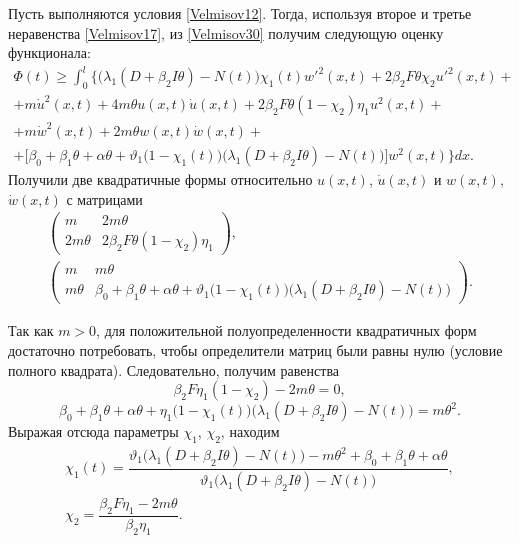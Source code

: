 Пусть выполняются условия \eqref{Velmisov12}.  Тогда, используя второе и третье неравенства \eqref{Velmisov17}, из  \eqref{Velmisov30} получим следующую оценку функционала:
\begin{multline}
\label{Velmisov31} 
\Phi(t)\ge \int_{0}^{l}
\bigl\{
\bigl(\lambda_1(D+\beta _{2}I \theta) -N(t)\bigr)\chi_1(t)w'^{2} (x,t)+
2\beta _{2}F \theta\chi_2 u'^{2} (x,t)+
\\
+m\dot{u}^{2} (x,t)+4m\theta u(x,t)\dot{u}(x,t)+2\beta _{2}F \theta (1-\chi_2)\eta _{1} u^{2} (x,t)+
\\ 
+m\dot{w}^{2} (x,t)+2m\theta w(x,t)\dot{w}(x,t)+
\\
+
\bigl[\beta _{0} +\beta _{1} \theta +\alpha \theta +\vartheta _{1} \bigl(1-\chi_1(t)\bigr) 
\bigl(\lambda _{1} (D+\beta _{2} I\theta )-N(t)\bigr)\bigr]w^{2} (x,t)\bigr\}dx.
\end{multline}
Получили две квадратичные формы относительно $u(x,t)$, $\dot{u}(x,t)$ и $w(x,t),$ $\dot{w}(x,t)$ с матрицами
\begin{gather*}
\left(\begin{array}{cc} {m} & {2m\theta}
 \\ {2m\theta} & {2\beta _{2}F \theta (1-\chi_2) \eta _{1} } \end{array}\right),
\\ 
\left(\begin{array}{cc} {m} & {m\theta}
 \\ {m\theta} & \beta _{0} +\beta _{1} \theta +\alpha \theta +\vartheta _{1} 
 \bigl(1-\chi_1(t)\bigr) \bigl(\lambda _{1} (D+\beta _{2} I\theta )-N(t)\bigr)  
\end{array}
\right).
\end{gather*}
 
Так как $m>0$, для положительной полуопределенности квадратичных форм достаточно потребовать, чтобы определители матриц были равны нулю (условие полного квадрата). 
Следовательно, получим равенства
\[ 
\beta _{2}F \eta _{1}(1-\chi_2) -2m\theta = 0, 
\]
\[
\beta _{0} +\beta _{1} \theta +\alpha \theta +
\eta _{1} \bigl(1-\chi_1(t)\bigr) \bigl( \lambda _{1} (D+\beta _{2}I \theta )-N(t)\bigr)=m\theta ^{2}. 
\]
Выражая отсюда параметры $\chi_1$, $\chi_2$, находим
\begin{equation} \label{Velmisov32} 
\begin{array}{l}
\chi_1(t)=\dfrac{\vartheta _{1} \bigl(\lambda _{1} (D+\beta _{2}I \theta )- N(t)\bigr) - 
m\theta ^{2} + \beta _{0}  + \beta _{1} \theta  + \alpha \theta}{\vartheta _{1} \bigl(\lambda _{1} (D+\beta _{2}I \theta )-N(t)\bigr)},\\[3mm]
\chi_2=\dfrac{\beta _{2}F \eta _{1} -2m\theta}{\beta _{2} \eta _{1}}. 
\end{array}
\end{equation}

